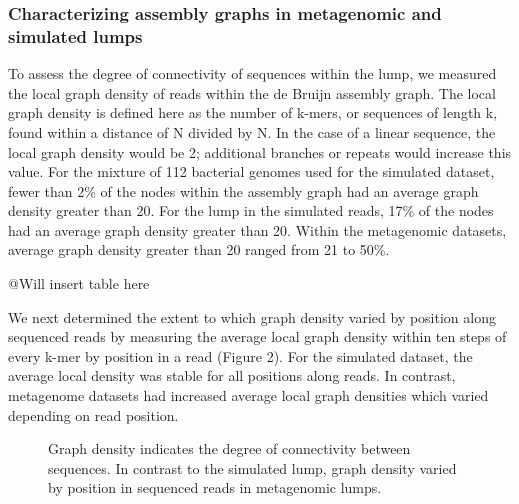 \documentclass[11pt]{article} %
\begin{document}
\subsubsection{Characterizing assembly graphs in metagenomic and simulated lumps}

To assess the degree of connectivity of sequences within the lump, we measured the local graph density of reads within the de Bruijn assembly graph.  The local graph density is defined here as the number of k-mers, or sequences of length k, found within a distance of N divided by N.  In the case of a linear sequence, the local graph density would be 2; additional branches or repeats would increase this value.  For the mixture of 112 bacterial genomes used for the simulated dataset, fewer than 2\% of the nodes within the assembly graph had an average graph density greater than 20.   For the lump in the simulated reads, 17\% of the nodes had an average graph density greater than 20.  Within the metagenomic datasets, average graph density greater than 20 ranged from 21 to 50\%.  

@Will insert table here

We next determined the extent to which graph density varied by position along sequenced reads by measuring the average local graph density within ten steps of every k-mer by position in a read (Figure 2).  For the simulated dataset, the average local density was stable for all positions along reads.  In contrast, metagenome datasets had increased average local graph densities which varied depending on read position.  

\begin{figure}
\caption{Graph density indicates the degree of connectivity between sequences.  In contrast to the simulated lump, graph density varied by position in sequenced reads in metagenomic lumps.}
\end{figure}
\end{document}
